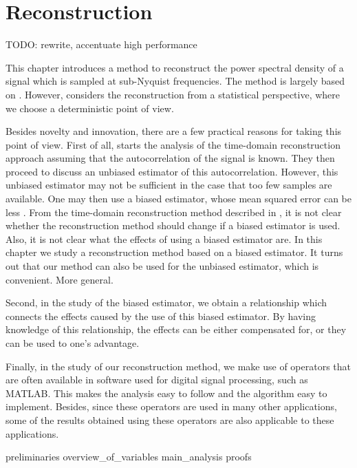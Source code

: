 \documentclass[a4paper, openany, oneside]{memoir}
\begin{document}
\chapter{Reconstruction}
TODO: rewrite, accentuate high performance

This chapter introduces a method to reconstruct the power spectral density of a signal which is sampled at sub-Nyquist frequencies. The method is largely based on \cite{ariananda2012compressive}. However, \cite{ariananda2012compressive} considers the reconstruction from a statistical perspective, where we choose a deterministic point of view.

Besides novelty and innovation, there are a few practical reasons for taking this point of view. First of all, \cite{ariananda2012compressive} starts the analysis of the time-domain reconstruction approach assuming that the autocorrelation of the signal is known. They then proceed to discuss an unbiased estimator of this autocorrelation. However, this unbiased estimator may not be sufficient in the case that too few samples are available. One may then use a biased estimator, whose mean squared error can be less \cite{percival1993univariate}. From the time-domain reconstruction method described in \cite{ariananda2012compressive}, it is not clear whether the reconstruction method should change if a biased estimator is used. Also, it is not clear what the effects of using a biased estimator are. In this chapter we study a reconstruction method based on a biased estimator. It turns out that our method can also be used for the unbiased estimator, which is convenient. More general.

Second, in the study of the biased estimator, we obtain a relationship which connects the effects caused by the use of this biased estimator. By having knowledge of this relationship, the effects can be either compensated for, or they can be used to one's advantage.

Finally, in the study of our reconstruction method, we make use of operators that are often available in software used for digital signal processing, such as MATLAB. This makes the analysis easy to follow and the algorithm easy to implement. Besides, since these operators are used in many other applications, some of the results obtained using these operators are also applicable to these applications. 

{preliminaries}
{overview_of_variables}
{main_analysis}
{proofs}



\end{document}
